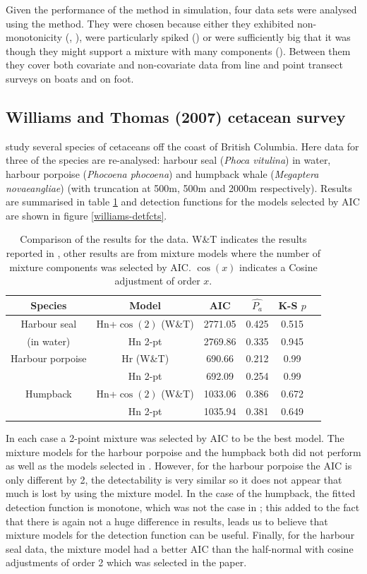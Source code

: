 Given the performance of the method in simulation, four data sets were analysed using the method. They were chosen because either they exhibited non-monotonicity (\cite{williams}, \cite{pike}), were particularly spiked (\cite{ants}) or were sufficiently big that it was though they might support a mixture with many components (\cite{amakihi}). Between them they cover both covariate and non-covariate data from line and point transect surveys on boats and on foot.

\subsection{Williams and Thomas (2007) cetacean survey}

 study several species of cetaceans off the coast of British Columbia. Here data for three of the species are re-analysed: harbour seal (\textit{Phoca vitulina}) in water, harbour porpoise (\textit{Phocoena phocoena}) and humpback whale (\textit{Megaptera novaeangliae}) (with truncation at 500m, 500m and 2000m respectively). Results are summarised in table \ref{williams-table} and detection functions for the models selected by AIC are shown in figure \ref{williams-detfcts}.

\begin{table}
\centering
\begin{tabular}{c c c c c c}
Species & Model & AIC & $\hat{P_a}$ & K-S $p$\\
\hline
Harbour seal & Hn+$\cos(2)$ (W\&T) & 2771.05 & 0.425 & 0.515\\
(in water) & Hn 2-pt  & 2769.86 & 0.335 & 0.945\\
Harbour porpoise & Hr (W\&T) & 690.66 & 0.212 & 0.99\\
 & Hn 2-pt & 692.09 & 0.254 & 0.99\\
Humpback & Hn+$\cos(2)$ (W\&T) & 1033.06 & 0.386 & 0.672 \\
 & Hn 2-pt & 1035.94 & 0.381 & 0.649 \\
\end{tabular}
\caption{Comparison of the results for the  data. W\&T indicates the results reported in , other results are from mixture models where the number of mixture components was selected by AIC. $\cos(x)$ indicates a Cosine adjustment of order $x$.}
\label{williams-table}
\end{table}

In each case a 2-point mixture was selected by AIC to be the best model. The mixture models for the harbour porpoise and the humpback both did not perform as well as the models selected in . However, for the harbour porpoise the AIC is only different by 2, the detectability is very similar so it does not appear that much is lost by using the mixture model. In the case of the humpback, the fitted detection function is monotone, which was not the case in ; this added to the fact that there is again not a huge difference in results, leads us to believe that mixture models for the detection function can be useful. Finally, for the harbour seal data, the mixture model had a better AIC than the half-normal with cosine adjustments of order 2 which was selected in the paper. 

